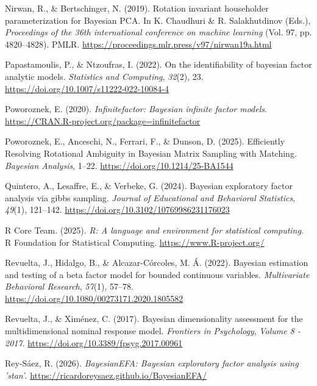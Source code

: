 \documentclass[
  man,
  longtable,
  nolmodern,
  notxfonts,
  notimes,
  colorlinks=true,linkcolor=blue,citecolor=blue,urlcolor=blue]{apa7}
\newlength{\cslhangindent}
\newenvironment{CSLReferences}[2] %
 {\begin{list}{}{%
  \setlength{\itemindent}{0pt}
  \setlength{\leftmargin}{0pt}
  \setlength{\parsep}{0pt}
  \ifodd #1
   \setlength{\leftmargin}{\cslhangindent}
   \setlength{\itemindent}{-1\cslhangindent}
  \fi
  \setlength{\itemsep}{#2\baselineskip}}}
 {\end{list}}
\theoremstyle{plain}
\theoremstyle{plain}
\theoremstyle{remark}
\begin{document}
\begin{CSLReferences}{1}{0}
Nirwan, R., \& Bertschinger, N. (2019). Rotation invariant householder
parameterization for {B}ayesian {PCA}. In K. Chaudhuri \& R.
Salakhutdinov (Eds.), \emph{Proceedings of the 36th international
conference on machine learning} (Vol. 97, pp. 4820--4828). PMLR.
\url{https://proceedings.mlr.press/v97/nirwan19a.html}

Papastamoulis, P., \& Ntzoufras, I. (2022). On the identifiability of
bayesian factor analytic models. \emph{Statistics and Computing},
\emph{32}(2), 23. \url{https://doi.org/10.1007/s11222-022-10084-4}

Poworoznek, E. (2020). \emph{Infinitefactor: Bayesian infinite factor
models}. \url{https://CRAN.R-project.org/package=infinitefactor}

Poworoznek, E., Anceschi, N., Ferrari, F., \& Dunson, D. (2025).
{Efficiently Resolving Rotational Ambiguity in Bayesian Matrix Sampling
with Matching}. \emph{Bayesian Analysis}, 1--22.
\url{https://doi.org/10.1214/25-BA1544}

Quintero, A., Lesaffre, E., \& Verbeke, G. (2024). Bayesian exploratory
factor analysis via gibbs sampling. \emph{Journal of Educational and
Behavioral Statistics}, \emph{49}(1), 121--142.
\url{https://doi.org/10.3102/10769986231176023}

R Core Team. (2025). \emph{R: A language and environment for statistical
computing}. R Foundation for Statistical Computing.
\url{https://www.R-project.org/}

Revuelta, J., Hidalgo, B., \& Alcazar-Córcoles, M. Á. (2022). Bayesian
estimation and testing of a beta factor model for bounded continuous
variables. \emph{Multivariate Behavioral Research}, \emph{57}(1),
57--78. \url{https://doi.org/10.1080/00273171.2020.1805582}

Revuelta, J., \& Ximénez, C. (2017). Bayesian dimensionality assessment
for the multidimensional nominal response model. \emph{Frontiers in
Psychology}, \emph{Volume 8 - 2017}.
\url{https://doi.org/10.3389/fpsyg.2017.00961}

Rey-Sáez, R. (2026). \emph{BayesianEFA: Bayesian exploratory factor
analysis using 'stan'}.
\url{https://ricardoreysaez.github.io/BayesianEFA/}


\end{CSLReferences}
\end{document}
